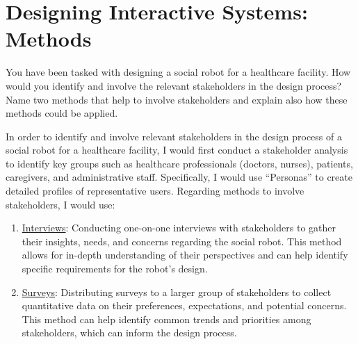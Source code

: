 \section{Designing Interactive Systems: Methods}

\begin{ejercicio}
    You have been tasked with designing a social robot for a healthcare facility. How would you identify and involve the relevant stakeholders in the design process? Name two methods that help to involve stakeholders and explain also how these methods could be applied.

    In order to identify and involve relevant stakeholders in the design process of a social robot for a healthcare facility, I would first conduct a stakeholder analysis to identify key groups such as healthcare professionals (doctors, nurses), patients, caregivers, and administrative staff. Specifically, I would use ``Personas'' to create detailed profiles of representative users. Regarding methods to involve stakeholders, I would use:
    \begin{enumerate}
        \item \ul{Interviews}: Conducting one-on-one interviews with stakeholders to gather their insights, needs, and concerns regarding the social robot. This method allows for in-depth understanding of their perspectives and can help identify specific requirements for the robot's design.
        \item \ul{Surveys}: Distributing surveys to a larger group of stakeholders to collect quantitative data on their preferences, expectations, and potential concerns. This method can help identify common trends and priorities among stakeholders, which can inform the design process.
    \end{enumerate}
\end{ejercicio}

